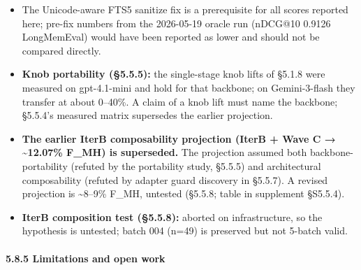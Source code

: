 \documentclass[
]{article}
\begin{document}
\begin{itemize}
  \textbf{KG path, MAP, MQ, adaptive classifier, and IterC} are opt-in
  features, not defaults. Each addresses a known structural gap;
  combined effects of KG, MQ and MAP are measured in §5.1.9, and the
  adaptive classifier and IterC were not tested in combination with
  them.
\item
  The Unicode-aware FTS5 sanitize fix is a prerequisite for all scores
  reported here; pre-fix numbers from the 2026-05-19 oracle run (nDCG@10
  0.9126 LongMemEval) would have been reported as lower and should not
  be compared directly.
\item
  \textbf{Knob portability (§5.5.5):} the single-stage knob lifts of
  §5.1.8 were measured on gpt-4.1-mini and hold for that backbone; on
  Gemini-3-flash they transfer at about 0--40\%. A claim of a knob lift
  must name the backbone; §5.5.4's measured matrix supersedes the
  earlier projection.
\item
  \textbf{The earlier IterB composability projection (IterB + Wave C →
  \textasciitilde12.07\% F\_MH) is superseded.} The projection assumed
  both backbone-portability (refuted by the portability study, §5.5.5)
  and architectural composability (refuted by adapter guard discovery in
  §5.5.7). A revised projection is \textasciitilde8--9\% F\_MH, untested
  (§5.5.8; table in supplement §S5.5.4).
\item
  \textbf{IterB composition test (§5.5.8):} aborted on infrastructure,
  so the hypothesis is untested; batch 004 (n=49) is preserved but not
  5-batch valid.
\end{itemize}

\paragraph{5.8.5 Limitations and open
work}\label{limitations-and-open-work}
\end{document}
